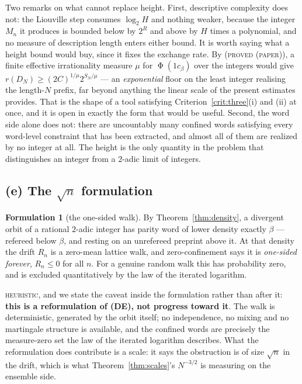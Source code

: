 \documentclass[11pt,reqno]{amsart}
\theoremstyle{plain}
\theoremstyle{definition}
\newtheorem{formulation}[theorem]{Formulation}
\DeclareMathOperator{\Ph}{\Phi}
\newcommand{\lab}[1]{\textnormal{\textsc{\small #1}}}
\begin{document}
\medskip
\noindent Two remarks on what cannot replace height. First, descriptive complexity does not: the Liouville step consumes
$\log_2 H$ and nothing weaker, because the integer $M_n$ it produces is bounded
below by $2^{R}$ and above by $H$ times a polynomial, and no measure of
description length enters either bound. It is worth saying what a height bound would buy, since it fixes the exchange
rate. By \cite[Thm.~5.2]{DeJesusB} (\lab{proved (paper)}), a finite effective
irrationality measure $\mu$ for $\Ph(1c_\beta)$ over the integers would give
$r(D_N)\ge(2C)^{1/\mu}2^{S_N/\mu}$ --- an \emph{exponential} floor on the least
integer realising the length-$N$ prefix, far beyond anything the linear scale of
the present estimates provides. That is the shape of a tool satisfying
Criterion~\ref{crit:three}(i) and (ii) at once, and it is open in exactly the form
that would be useful. Second, the word side alone does not: there
are uncountably many confined words satisfying every word-level constraint that
has been extracted, and almost all of them are realized by no integer at all. The
height is the only quantity in the problem that distinguishes an integer from a
$2$-adic limit of integers.

\subsection*{(e) The $\sqrt n$ formulation}

\begin{formulation}[the one-sided walk]\label{form:walk}
By Theorem~\ref{thm:density}, a divergent orbit of a rational $2$-adic integer has
parity word of lower density exactly $\beta$ --- refereed below $\beta$, and
resting on an unrefereed preprint above it. At that density the drift $R_n$ is a
zero-mean lattice walk, and zero-confinement says it is \emph{one-sided forever},
$R_n\le0$ for all $n$. For a genuine random walk this has probability zero, and is
excluded quantitatively by the law of the iterated logarithm.
\end{formulation}
\lab{heuristic}, and we state the caveat inside the formulation rather than after
it: \textbf{this is a reformulation of \textup{(DE)}, not progress toward it}. The
walk is deterministic, generated by the orbit itself; no independence, no mixing
and no martingale structure is available, and the confined words are precisely the
measure-zero set the law of the iterated logarithm describes. What the
reformulation does contribute is a scale: it says the obstruction is of size
$\sqrt n$ in the drift, which is what Theorem~\ref{thm:scales}'s $N^{-3/2}$ is
measuring on the ensemble side.
\end{document}
